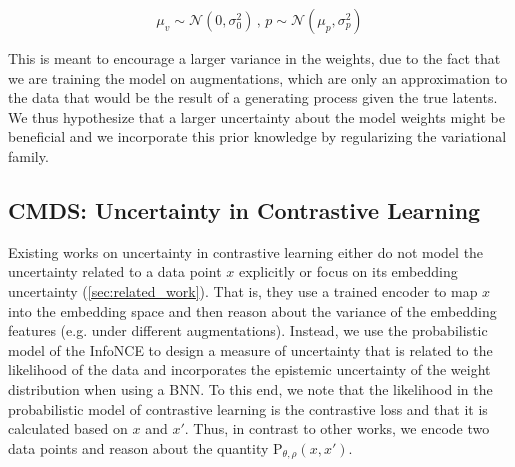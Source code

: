 \documentclass[tablecaption=bottom,wcp]{jmlr} %
\begin{document}
\begin{equation}
 \mu_{v} \sim \mathcal{N}(0, \sigma_{0}^{2}) \, , \, p \sim \mathcal{N}(\mu_{p}, \sigma_{p}^{2})
\end{equation}


This is meant to encourage a larger variance in the weights, due to the fact that we are training the model on augmentations, which are only an approximation to the data that would be the result of a generating process given the true latents. We thus hypothesize that a larger uncertainty about the model weights might be beneficial and we incorporate this prior knowledge by regularizing the variational family. 

\subsection{CMDS: Uncertainty in Contrastive Learning}
\label{sec:cmds}

Existing works on uncertainty in contrastive learning either do not model the uncertainty related to a data point $x$ explicitly or focus on its embedding uncertainty (\cref{sec:related_work}). That is, they use a trained encoder to map $x$ into the embedding space and then reason about the variance of the embedding features (e.g. under different augmentations). Instead, we use the probabilistic model of the InfoNCE to design a measure of uncertainty that is related to the likelihood of the data and incorporates the epistemic uncertainty of the weight distribution when using a BNN. To this end, we note that the likelihood in the probabilistic model of contrastive learning is the contrastive loss and that it is calculated based on $x$ and $x'$. Thus, in contrast to other works, we encode two data points and reason about the quantity $\mathrm{P}_{\theta, \rho}(x,x')$. 
\end{document}

